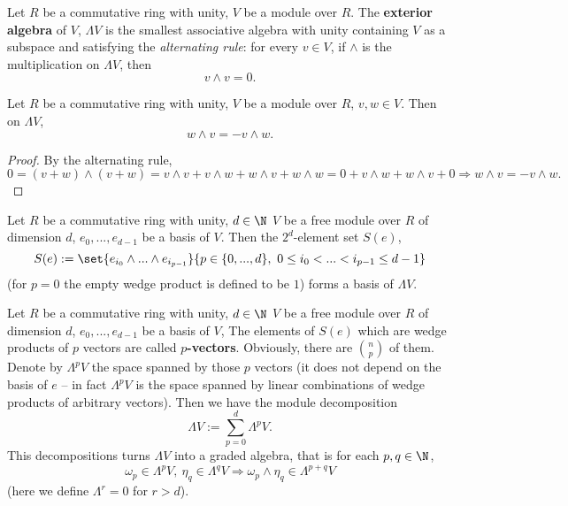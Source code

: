 \begin{definition}
  Let
    $R$ be a commutative ring with unity,
    $V$ be a module over $R$.
  The \textbf{exterior algebra} of $V$, $\Lambda V$ is the smallest associative
  algebra with unity containing $V$ as a subspace and satisfying the
  \textit{alternating rule}:
  for every $v \in V$, if $\wedge$ is the multiplication on $\Lambda V$, then
  \begin{equation}
    v \wedge v = 0.
  \end{equation}
\end{definition}
\begin{corollary}
  Let
    $R$ be a commutative ring with unity,
    $V$ be a module over $R$,
    $v, w \in V$.
  Then on $\Lambda V$,
  \begin{equation}
    w \wedge v = - v \wedge w.
  \end{equation}
\end{corollary}
\begin{proof}
  By the alternating rule,
  \begin{equation}
    0 = (v + w) \wedge (v + w)
    = v \wedge v + v \wedge w + w \wedge v + w \wedge w
    = 0 + v \wedge w + w \wedge v + 0
    \Rightarrow w \wedge v = - v \wedge w.
  \end{equation}
\end{proof}
\begin{proposition}
  Let
    $R$ be a commutative ring with unity,
    $d \in \N$
    $V$ be a free module over $R$ of dimension $d$,
    $e_0, ..., e_{d - 1}$ be a basis of $V$.
  Then the $2^d$-element set $S(e)$,
  \begin{equation}
    S(e) :=
    \set{e_{i_0} \wedge ... \wedge e_{i_{p - 1}}}
    {p \in \{0, ..., d\},\ 0 \leq i_0 < ... < i_{p - 1} \leq d - 1}
  \end{equation}
  (for $p = 0$ the empty wedge product is defined to be $1$)
  forms a basis of $\Lambda V$.
\end{proposition}
\begin{remark}
   Let
    $R$ be a commutative ring with unity,
    $d \in \N$
    $V$ be a free module over $R$ of dimension $d$,
    $e_0, ..., e_{d - 1}$ be a basis of $V$,
  The elements of $S(e)$ which are wedge products of $p$ vectors are called
  \textbf{$p$-vectors}.
  Obviously, there are $\binom{n}{p}$ of them.
  Denote by $\Lambda^p V$ the space spanned by those $p$ vectors
  (it does not depend on the basis of $e$ -- in fact $\Lambda^p V$ is the space
  spanned by linear combinations of wedge products of arbitrary vectors).
  Then we have the module decomposition
  \begin{equation}
    \Lambda V := \sum_{p = 0}^d \Lambda^p V.
  \end{equation}
  This decompositions turns $\Lambda V$ into a graded algebra, that is for each
  $p, q \in \N$,
  \begin{equation}
    \omega_p \in \Lambda^p V,\ \eta_q \in \Lambda^q V
    \Rightarrow \omega_p \wedge \eta_q \in \Lambda^{p + q} V
  \end{equation}
  (here we define $\Lambda^r = 0$ for $r > d$).
\end{remark}

